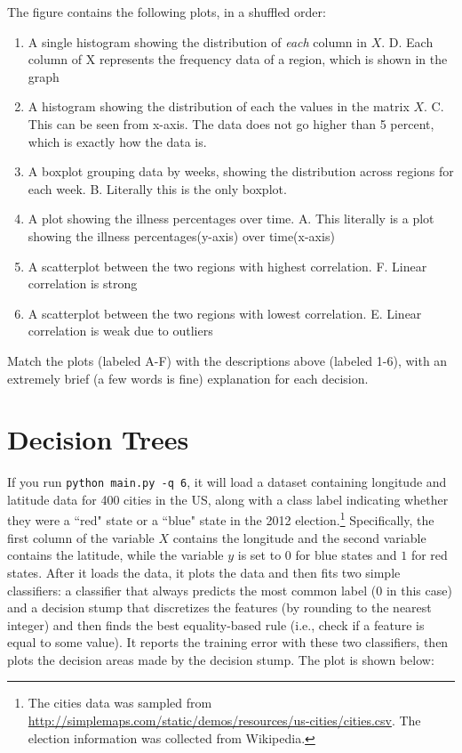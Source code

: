 \documentclass{article}
\def\blu#1{{\color{blu}#1}}
\def\red#1{{\color{red}#1}}
\def\enum#1{\begin{enumerate}#1\end{enumerate}}
\begin{document}
The figure contains the following plots, in a shuffled order:
\enum{
\item A single histogram showing the distribution of \emph{each} column in $X$. \red{D. Each column of X represents the frequency data of a region, which is shown in the graph}
\item A histogram showing the distribution of each the values in the matrix $X$. \red{C. This can be seen from x-axis. The data does not go higher than 5 percent, which is exactly how the data is.}
\item A boxplot grouping data by weeks, showing the distribution across regions for each week. \red{B. Literally this is the only boxplot.}
\item A plot showing the illness percentages over time. \red{A. This literally is a plot showing the illness percentages(y-axis) over time(x-axis) }
\item A scatterplot between the two regions with highest correlation. \red{F. Linear correlation is strong}
\item A scatterplot between the two regions with lowest correlation. \red{E. Linear correlation is weak due to outliers}
}

\blu{Match the plots (labeled A-F) with the descriptions above (labeled 1-6), with an extremely brief (a few words is fine) explanation for each decision.}



\section{Decision Trees}

If you run \texttt{python main.py -q 6}, it will load a dataset containing longitude 
and latitude data for 400 cities in the US, along with a class label indicating
 whether they were a ``red" state or a ``blue" state in the 2012 
 election.\footnote{The cities data was sampled from \url{http://simplemaps.com/static/demos/resources/us-cities/cities.csv}. The election information was collected from Wikipedia.}
Specifically, the first column of the variable $X$ contains the 
longitude and the second variable contains the latitude,
while the variable $y$ is set to $0$ for blue states and $1$ for red states.
After it loads the data, it plots the data and then fits two simple 
classifiers: a classifier that always predicts the
most common label ($0$ in this case) and a decision stump
that discretizes the features (by rounding to the nearest integer)
and then finds the best equality-based rule (i.e., check
 if a feature is equal to some value).
It reports the training error with these two classifiers, then plots the decision areas made by the decision stump.
The plot is shown below:
\end{document}
